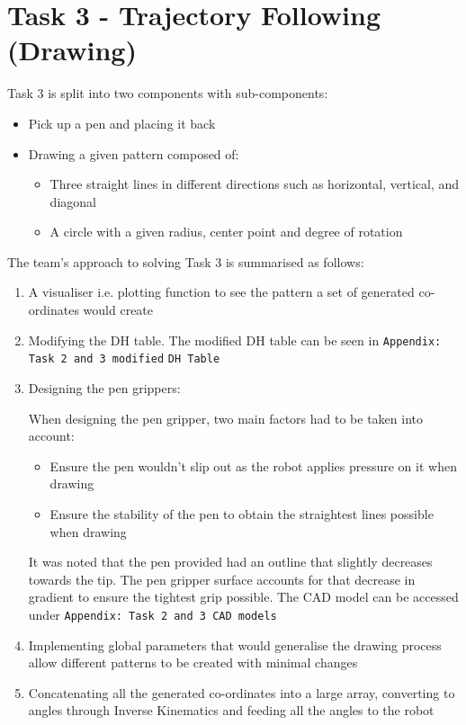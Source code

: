 \documentclass[9pt, a4paper]{article}
\begin{document}
\section{Task 3 - Trajectory Following (Drawing)}

Task 3 is split into two components with sub-components: 
\begin{itemize}
  \item Pick up a pen and placing it back 
  \item Drawing a given pattern composed of:
  \begin{itemize}
    \item Three straight lines in different directions such as horizontal, vertical, and diagonal
    \item A circle with a given radius, center point and degree of rotation 
  \end{itemize}
\end{itemize}

The team's approach to solving Task 3 is summarised as follows:
\begin{enumerate}
  \item A visualiser i.e. plotting function to see the pattern a set of
  generated co-ordinates would create 
  \item Modifying the DH table. The modified DH table can be seen in
  \verb+Appendix: Task 2 and 3 modified+ \verb+DH Table+
  \item Designing the pen grippers:
  
  When designing the pen gripper, two main factors had to be taken into account:
  \begin{itemize}
    \item Ensure the pen wouldn't slip out as the robot applies pressure on it when drawing
    \item Ensure the stability of the pen to obtain the straightest lines possible when drawing
  \end{itemize}

  It was noted that the pen provided had an outline that slightly decreases
  towards the tip. The pen gripper surface accounts for that decrease in
  gradient to ensure the tightest grip possible. The CAD model can be accessed 
  under \verb+Appendix: Task 2 and 3 CAD models+ 

  \item Implementing global parameters that would generalise the drawing process
  allow different patterns to be created with minimal changes 
  \item Concatenating all the generated co-ordinates into a large array,
  converting to angles through Inverse Kinematics and feeding all the angles to the robot 
\end{enumerate}
\end{document}
